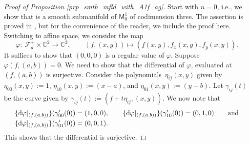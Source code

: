 \documentclass[pdftex]{sigma}
\numberwithin{equation}{section}
\begin{document}
\begin{proof}[Proof of Proposition \ref{prp_smth_mfld_with_A1f_ag}]
Start with $n = 0$, i.e., we show that 
is a smooth submanifold of $\mathsf{M}^1_0$ of codimension three.
The assertion is proved in \cite[pp.~216--217]{McSa},
but for the convenience of the reader, we include the proof here.
Switching to affine space, we consider the map
\[
\varphi \colon\ \mathcal{F}_d^{+} \times \mathbb{C}^2  \longrightarrow  \mathbb{C}^3, \qquad
(f, (x, y)) \longmapsto (f(x, y), f_x(x, y), f_y(x, y)).
\]
It suffices to show that $(0,0,0)$ is a regular value of $\varphi$.
Suppose $\varphi(f, (a,b)) =0$. We need to
show that the differential of $\varphi$, evaluated at $(f, (a,b))$ is surjective.
Consider the polynomials~$\eta_{ij}(x, y)$ given by
$
\eta_{00}(x, y) := 1$, $ \eta_{10}(x, y) := (x-a)$, and $\eta_{01}(x, y) := (y-b)$.
Let $\gamma_{ij}(t)$ be the curve given by
$\gamma_{ij}(t) :=  (f+t \eta_{ij}, (x,y))$.
We now note that
\begin{align}
\{{\rm d}\varphi|_{(f, (a,b))}\}(\gamma_{00}^{\prime}(0)) & = (1,0,0), \qquad
\{{\rm d}\varphi|_{(f, (a,b))}\}(\gamma_{10}^{\prime}(0)) = (0,1,0)
\qquad \textnormal{and} \nonumber \\
\{{\rm d}\varphi|_{(f, (a,b))}\}(\gamma_{01}^{\prime}(0)) & = (0,0,1). \nonumber
\end{align}
This shows that the differential is surjective.


\end{proof}
\end{document}
